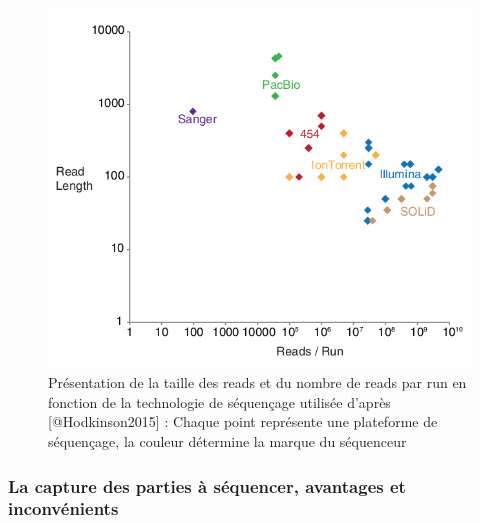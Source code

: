 \documentclass[12pt,twoside]{reedthesis}
\theoremstyle{definition}
\theoremstyle{definition}
\theoremstyle{remark}
\begin{document}
  \begin{figure}
  
  {\centering \includegraphics[scale=.55]{figure/read_per_run} 
  
  }
  
  \caption[Présentation de la taille des reads et du nombre de reads par run en fonction de la technologie de séquençage utilisée]{Présentation de la taille des reads et du nombre de reads par run en fonction de la technologie de séquençage utilisée d'après [@Hodkinson2015] : Chaque point représente une plateforme de séquençage, la couleur détermine la marque du séquenceur}\label{fig:readPerRun}
  \end{figure}
  
  \subsubsection{La capture des parties à séquencer, avantages et
  inconvénients}\label{la-capture-des-parties-a-sequencer-avantages-et-inconvenients}
  
\end{document}
